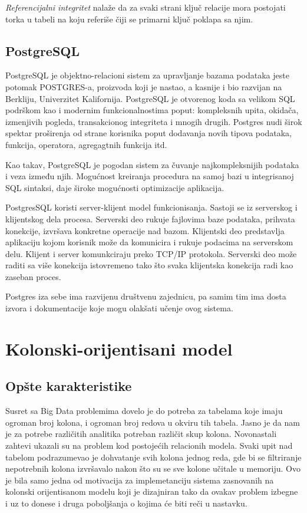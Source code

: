 \documentclass[12pt,oneside]{memoir}
\begin{document}
\textit{Referencijalni integritet} nalaže da za svaki strani ključ relacije mora postojati torka u tabeli na koju referiše čiji se primarni ključ poklapa sa njim.

\subsection{PostgreSQL}


PostgreSQL je objektno-relacioni sistem za upravljanje bazama podataka jeste potomak POSTGRES-a, proizvoda koji je nastao, a kasnije i bio razvijan na Berkliju, Univerzitet Kalifornija. PostgreSQL je otvorenog koda sa velikom SQL podrškom kao i modernim funkcionalnostima poput: kompleksnih upita, okidača, izmenjivih pogleda, transakcionog integriteta i mnogih drugih. Postgres nudi širok spektar proširenja od strane korisnika poput dodavanja novih tipova podataka, funkcija, operatora, agregagtnih funkcija itd. 

Kao takav, PostgreSQL je pogodan sistem za čuvanje najkompleksnijih podataka i veza između njih. Mogućnost kreiranja procedura na samoj bazi u integrisanoj SQL sintaksi, daje široke mogućnosti optimizacije aplikacija. 

PostgresSQL koristi server-klijent model funkcionisanja. Sastoji se iz serverskog i klijentskog dela procesa. Serverski deo rukuje fajlovima baze podataka, prihvata konekcije, izvršava konkretne operacije nad bazom. Klijentski deo predstavlja aplikaciju kojom korisnik može da komunicira i rukuje podacima na serverskom delu. Klijent i server komunkciraju preko TCP/IP protokola. Serverski deo može raditi sa više konekcija istovremeno tako što svaka klijentska konekcija radi kao zaseban proces.

Postgres iza sebe ima razvijenu društvenu zajednicu, pa samim tim ima dosta izvora i dokumentacije koje mogu olakšati učenje ovog sistema.  \cite{PostgreSQLUpAndRunning}

\section{Kolonski-orijentisani model}
\subsection{Opšte karakteristike}
\cite{ColumnarOriented}
Susret sa Big Data problemima dovelo je do potreba za tabelama koje imaju ogroman broj kolona, i ogroman broj redova u okviru tih tabela. Jasno je da nam je za potrebe različitih analitika potreban različit skup kolona. Novonastali zahtevi ukazali su na problem kod postojećih  relacionih modela. Svaki upit nad tabelom podrazumevao je dohvatanje svih kolona jednog reda, gde bi se filtriranje nepotrebnih kolona izvršavalo nakon što su se sve kolone učitale u memoriju. Ovo je bila samo jedna od motivacija za implemetanciju sistema zasnovanih na kolonski orijentisanom modelu koji je dizajniran tako da ovakav problem izbegne i uz to donese i druga poboljšanja o kojima će biti reči u nastavku.
\end{document}

